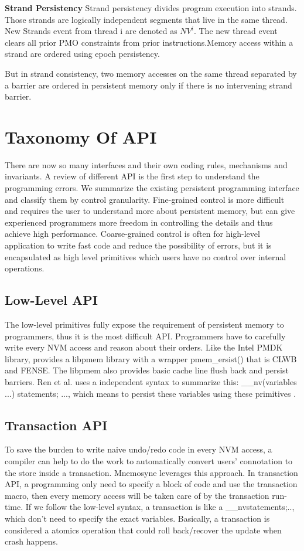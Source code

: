\documentclass{sig-alternate}
\begin{document}
\textbf{Strand Persistency} Strand persistency divides program execution into strands. Those strands are logically independent segments that live in the same thread. New Strands event from thread i are denoted as $NV^{i}$. The new thread event clears all prior PMO constraints from prior instructions.Memory access within a strand are ordered using epoch persistency. 

But in strand consistency, two memory accesses on the same thread separated by a barrier are ordered in persistent memory only if there is no intervening strand barrier.

\section{Taxonomy Of API}

There are now so many interfaces and their own coding rules, mechanisms and invariants. A review of different API is the first step to understand the programming errors. We summarize the existing persistent programming interface and classify them by control granularity. Fine-grained control is more difficult and requires the user to understand more about persistent memory, but can give experienced programmers more freedom in controlling the details and thus achieve high performance. Coarse-grained control is often for high-level application to write fast code and reduce the possibility of errors, but it is encapsulated as high level primitives which users have no control over internal operations.
\subsection{Low-Level API}

The low-level primitives fully expose the requirement of persistent memory to programmers, thus it is the most difficult API. Programmers have to carefully write every NVM access and reason about their orders. Like the Intel PMDK library, provides a libpmem library with a wrapper pmem\_ersist() that is CLWB and FENSE. The libpmem also provides basic cache line flush back and persist barriers. Ren et al. uses a independent syntax to summarize this: \_\_nv(variables ...){ statements; ...}, which means to persist these variables using these primitives \cite{Ren:2017:PNM:3124680.3124729}. 
\subsection{Transaction API}
To save the burden to write naive undo/redo code in every NVM access, a compiler can help to do the work to automatically convert users' connotation to the store inside a transaction. Mnemosyne\cite{Volos:2011:MLP:2248487.1950379} leverages this approach. In transaction API, a programming only need to specify a block of code and use the transaction macro, then every memory access will be taken care of by the transaction run-time. If we follow the low-level syntax, a transaction is like a \_\_nv{statements;..}, which don't need to specify the exact variables. Basically, a transaction is considered a atomics operation that could roll back/recover the update when crash happens.
\end{document}
